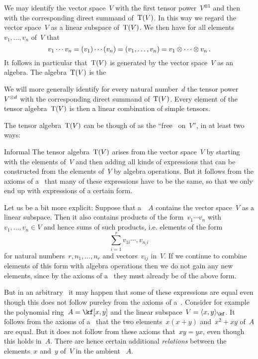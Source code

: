 \begin{recall}
\begin{description}
      We may identify the vector space~$V$ with the first tensor power~$V^{\otimes 1}$ and then with the corresponding direct summand of~$\operatorname{T}(V)$.
      In this way we regard the vector space~$V$ as a linear subspace of~$\operatorname{T}(V)$.
      We then have for all elements~$v_1, \dotsc, v_n$ of~$V$ that
      \[
        v_1 \dotsm v_n
        =
        (v_1) \dotsm (v_n)
        =
        (v_1, \dotsc, v_n)
        =
        v_1 \otimes \dotsb \otimes v_n  \,.
      \]
      It follows in particular that~$\operatorname{T}(V)$ is generated by the vector space~$V$ as an algebra.
      The algebra~$\operatorname{T}(V)$ is the 
      
      We will more generally identify for every natural number~$d$ the tensor power~$V^{\otimes d}$ with the corresponding direct summand of~$\operatorname{T}(V)$.
      Every element of the tensor algebra~$\operatorname{T}(V)$ is then a linear combination of simple tensors.
    
    \item[Universal Property]
      The tensor algebra~$\operatorname{T}(V)$ can be though of as the \enquote{free~{\algebra{$\kf$}} on~$V$}, in at least two ways:
      \begin{description*}
        \item[Informal]
          The tensor algebra~$\operatorname{T}(V)$ arises from the vector space~$V$ by starting with the elements of~$V$ and then adding all kinds of expressions that can be constructed from the elements of~$V$ by algebra operations.
          But it follows from the axioms of a~ that many of these expressions have to be the same, so that we only end up with expressions of a certain form.
          
          Let us be a bit more explicit:
          Suppose that a~{\algebra{$\kf$}}~$A$ contains the vector space~$V$ as a linear subspace.
          Then it also contains products of the form~$v_1 \dotsm v_n$ with~$v_1, \dotsc, v_n \in V$ and hence sums of such products, i.e. elements of the form
          \[
            \sum_{i=1}^r v_{1i} \dotsm, v_{n_i i}
          \]
          for natural numbers~$r, n_1, \dotsc, n_r$ and vectors~$v_{ij}$ in~$V$.
          If we continue to combine elements of this form with algebra operations then we do not gain any new elements, since by the axioms of a~\algebra{$\kf$} they must already be of the above form.
          
          But in an arbitrary~{\algebra{$\kf$}} it may happen that some of these expressions are equal even though this does not follow pureley from the axioms of a~{\algebra{$\kf$}}.
          Consider for example the polynomial ring~$A = \kf[x, y]$ and the linear subspace~$V = \gen{x, y}_{\kf}$.
          It follows from the axioms of a~{\algebra{$\kf$}} that the two elements~$x (x+y)$ and~$x^2 + xy$ of~$A$ are equal.
          But it does not follow from these axioms that~$xy = yx$, even though this holds in~$A$.
          There are hence certain additional \emph{relations} between the elements~$x$ and~$y$ of~$V$ in the ambient {\algebra{$\kf$}}~$A$.
          

\end{description*}
\end{description}
\end{recall}
